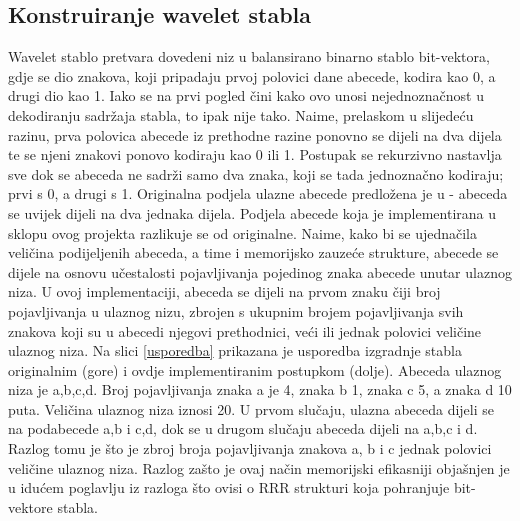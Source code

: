 \subsection{Konstruiranje wavelet stabla}

Wavelet stablo pretvara dovedeni niz u balansirano binarno stablo bit-vektora, gdje se dio znakova, koji pripadaju prvoj polovici dane abecede, kodira kao 0, a drugi dio kao 1. Iako se na prvi pogled čini kako ovo unosi nejednoznačnost u dekodiranju sadržaja stabla, to ipak nije tako. Naime, prelaskom u slijedeću razinu, prva polovica abecede iz prethodne razine ponovno se dijeli na dva dijela te se njeni znakovi ponovo kodiraju kao 0 ili 1. Postupak se rekurzivno nastavlja sve dok se abeceda ne sadrži samo dva znaka, koji se tada jednoznačno kodiraju; prvi s 0, a drugi s 1. 
Originalna podjela ulazne abecede predložena je u \cite{wavelet} - abeceda se uvijek dijeli na dva jednaka dijela. Podjela abecede koja je implementirana u sklopu ovog projekta razlikuje se od originalne. Naime, kako bi se ujednačila veličina podijeljenih abeceda, a time i memorijsko zauzeće strukture, abecede se dijele na osnovu učestalosti pojavljivanja pojedinog znaka abecede unutar ulaznog niza. U ovoj implementaciji, abeceda se dijeli na prvom znaku čiji broj pojavljivanja u ulaznog nizu, zbrojen s ukupnim brojem pojavljivanja svih znakova koji su u abecedi njegovi prethodnici, veći ili jednak polovici veličine ulaznog niza.
Na slici \ref{usporedba} prikazana je usporedba izgradnje stabla originalnim (gore) i ovdje implementiranim postupkom (dolje). Abeceda ulaznog niza je {a,b,c,d}. Broj pojavljivanja znaka a je 4, znaka b 1, znaka c 5, a znaka d 10 puta. Veličina ulaznog niza iznosi 20. U prvom slučaju, ulazna abeceda dijeli se na podabecede {a,b} i {c,d}, dok se u drugom slučaju abeceda dijeli na {a,b,c} i {d}. Razlog tomu je što je zbroj broja pojavljivanja znakova a, b i c jednak polovici veličine ulaznog niza.
Razlog zašto je ovaj način memorijski efikasniji objašnjen je u idućem poglavlju iz razloga što ovisi o RRR strukturi koja pohranjuje bit-vektore stabla.

